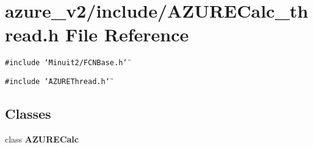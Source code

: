 \section{azure\_\-v2/include/AZURECalc\_\-thread.h File Reference}
\label{AZURECalc__thread_8h}
{\tt \#include \char`\"{}Minuit2/FCNBase.h\char`\"{}}\par
{\tt \#include \char`\"{}AZUREThread.h\char`\"{}}\par
\subsection*{Classes}
\begin{CompactItemize}
\item 
class \bf{AZURECalc}
\end{CompactItemize}
